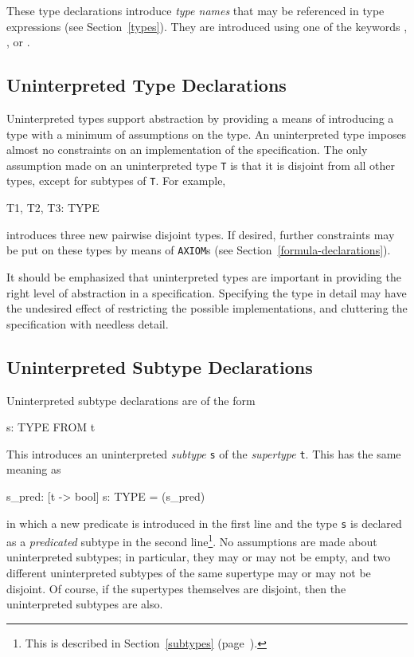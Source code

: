 These type declarations introduce \emph{type names}
that may be referenced in type expressions (see Section~\ref{types}).
They are introduced using one of the keywords
,
, or
.

\subsection{Uninterpreted Type Declarations}

Uninterpreted types support abstraction by providing a means of
introducing a type with a minimum of assumptions on the type.  An
uninterpreted type imposes almost no constraints on an implementation of
the specification.  The only assumption made on an uninterpreted type
\texttt{T} is that it is disjoint from all other types, except for
subtypes of \texttt{T}.  For example,
\begin{pvsex}
  T1, T2, T3: TYPE
\end{pvsex}
%
introduces three new pairwise disjoint types.  If desired,
further constraints may be put on these types by means of \texttt{AXIOM}s
(see Section~\ref{formula-declarations}).

It should be emphasized that uninterpreted types are important in
providing the right level of abstraction in a specification.  Specifying
the type in detail may have the undesired effect of restricting the
possible implementations, and cluttering the specification with needless
detail.



\subsection{Uninterpreted Subtype Declarations}

Uninterpreted subtype declarations are of the form
\begin{pvsex}
  s: TYPE FROM t
\end{pvsex}
This introduces an uninterpreted
\emph{subtype} \texttt{s} of
the \emph{supertype}
\texttt{t}.  This has the same meaning as
\begin{pvsex}
  s_pred: [t -> bool]
  s: TYPE = (s_pred)
\end{pvsex}
%
in which a new predicate is introduced in the first line and the type
\texttt{s} is declared as a \emph{predicated} subtype in the second
line\footnote{This is described in Section~\ref{subtypes}
(page~\pageref{subtypes}).}.  No assumptions are made about uninterpreted
subtypes; in particular, they may or may not be empty, and two different
uninterpreted subtypes of the same supertype may or may not be disjoint.
Of course, if the supertypes themselves are disjoint, then the
uninterpreted subtypes are also.

